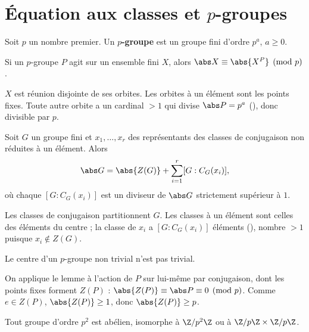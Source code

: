 \section{Équation aux classes et $p$-groupes}
\begin{definition}[$p$-groupe]
Soit $p$ un nombre premier. Un \textbf{$p$-groupe} est un groupe fini d'ordre $p^a$, $a\ge0$.
\end{definition}
\begin{lemme}\label{lem-points-fixes}
Si un $p$-groupe $P$ agit sur un ensemble fini $X$, alors $\abs X\equiv\abs{X^P}\pmod p$.
\end{lemme}
\begin{preuve}
$X$ est réunion disjointe de ses orbites. Les orbites à un élément sont les points fixes. Toute autre orbite a un cardinal $>1$ qui divise $\abs P=p^a$ (), donc divisible par $p$.
\end{preuve}
\begin{theoreme}\label{thm-equation-classes}
Soit $G$ un groupe fini et $x_1,\dots,x_r$ des représentants des classes de conjugaison non réduites à un élément. Alors
\[\abs G=\abs{Z(G)}+\sum_{i=1}^r[G:C_G(x_i)],\]
où chaque $[G:C_G(x_i)]$ est un diviseur de $\abs G$ strictement supérieur à $1$.
\end{theoreme}
\begin{preuve}
Les classes de conjugaison partitionnent $G$. Les classes à un élément sont celles des éléments du centre ; la classe de $x_i$ a $[G:C_G(x_i)]$ éléments (), nombre $>1$ puisque $x_i\notin Z(G)$.
\end{preuve}
\begin{theoreme}\label{thm-centre-p}
Le centre d'un $p$-groupe non trivial n'est pas trivial.
\end{theoreme}
\begin{preuve}
On applique le lemme  à l'action de $P$ sur lui-même par conjugaison, dont les points fixes forment $Z(P)$ : $\abs{Z(P)}\equiv\abs P\equiv0\pmod p$. Comme $e\in Z(P)$, $\abs{Z(P)}\ge1$, donc $\abs{Z(P)}\ge p$.
\end{preuve}
\begin{corollaire}\label{cor-p2}
Tout groupe d'ordre $p^2$ est abélien, isomorphe à $\Z/p^2\Z$ ou à $\Z/p\Z\times\Z/p\Z$.
\end{corollaire}

